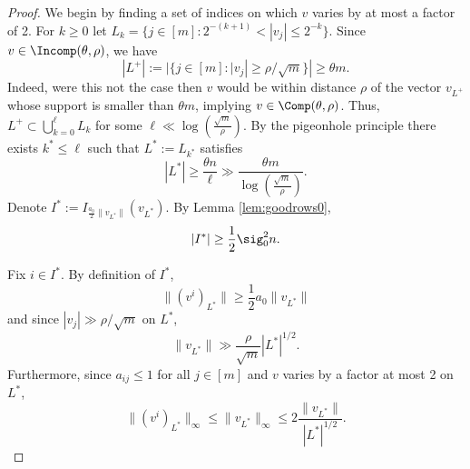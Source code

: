 \documentclass[aop,preprint]{imsart}
\theoremstyle{plain}
\theoremstyle{definition}
\theoremstyle{remark}
\numberwithin{equation}{section}
\numberwithin{theorem}{section}
\begin{document}
\begin{proof}
We begin by finding a set of indices on which $v$ varies by at most a factor of 2. 
For $k\ge 0$ let $L_k = \{j\in [m]: 2^{-(k+1)}<|v_j|\le 2^{-k}\}$. 
Since $v\in \Incomp(\theta,\rho)$, we have
\[
|L^+| := |\{j\in [m]: |v_j|\ge \rho/\sqrt{m}\}| \ge \theta m.
\]
Indeed, were this not the case then $v$ would be within distance $\rho$ of the vector $v_{L^+}$ whose support is smaller than $\theta m$, implying $v\in \Comp(\theta,\rho)$. 
Thus,
$
L^+\subset \bigcup_{k=0}^\ell L_k
$
for some $\ell \ll \log(\frac{\sqrt{m}}{\rho})$.
By the pigeonhole principle there exists $k^*\le \ell$ such that $L^*:= L_{k^*}$ satisfies
\begin{equation}	\label{LB:Lstar}
|L^*|\ge \frac{\theta n}{\ell} \gg \frac{\theta m}{ \log(\frac{\sqrt{m}}{\rho})}.
\end{equation}
Denote $I^*:= I_{\frac{a_0}{2}\|v_{L^*}\|}(v_{L^*})$.
By Lemma \ref{lem:goodrows0}, 
\begin{equation}	\label{LB:istar}
|I^*|\ge \frac12\sig_0^2 n.
\end{equation}

Fix $i\in I^*$.
By definition of $I^*$, 
\begin{equation}	\label{vi:2}
\| (v^i)_{L^*}\| \ge \frac{1}{2}a_0 \|v_{L^*}\| 
\end{equation}
and since $|v_j|\gg \rho/\sqrt{m}$ on $L^*$, 
\begin{equation}	\label{vstar:2}
\|v_{L^*}\| \gg \frac{\rho}{\sqrt{m}}|L^*|^{1/2}.
\end{equation}
Furthermore, since $a_{ij}\le 1$ for all $j\in [m]$ and $v$ varies by a factor at most 2 on $L^*$, 
\begin{equation}	\label{vi:infty}
\|(v^i)_{L^*}\|_\infty \le \|v_{L^*}\|_{\infty} \le 2\frac{\|v_{L^*}\|}{|L^*|^{1/2}}.
\end{equation}


\end{proof}
\end{document}
